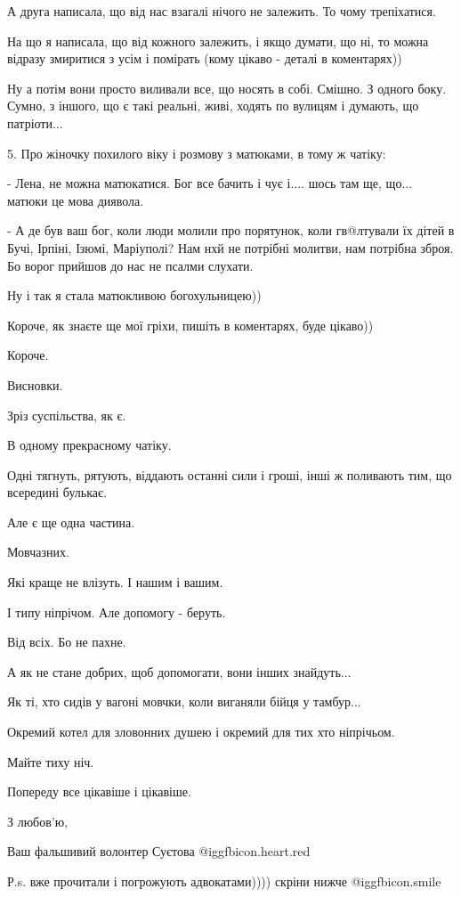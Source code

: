 А друга написала, що від нас взагалі нічого не залежить. То чому трепіхатися.

На що я написала, що від кожного залежить, і якщо думати, що ні, то можна
відразу змиритися з усім і помірать
 (кому цікаво  - деталі в коментарях))

Ну а потім вони просто виливали все, що носять в собі. 
Смішно. З одного боку.
Сумно, з іншого, що є такі реальні, живі, ходять по вулицям і думають, що патріоти...

5. Про жіночку похилого віку і розмову з матюками, в тому ж чатіку:

- Лена, не можна матюкатися. Бог все бачить і чує і.... шось там ще, що...
матюки це мова диявола.

- А де був ваш бог, коли люди молили про порятунок, коли гв@лтували їх дітей в
Бучі, Ірпіні, Ізюмі, Маріуполі? Нам нхй не потрібні молитви, нам потрібна
зброя. Бо ворог прийшов до нас не псалми слухати.

Ну і так я стала матюкливою богохульницею))

Короче, як знаєте ще мої гріхи, пишіть в коментарях, буде цікаво))

Короче.

Висновки.

Зріз суспільства, як є. 

В одному прекрасному чатіку.

Одні тягнуть, рятують, віддають останні сили і гроші, інші ж поливають тим, що
всередині булькає.

Але є ще одна частина.

Мовчазних. 

Які краще не влізуть. І нашим і вашим.

І типу ніпрічом. Але допомогу - беруть. 

Від всіх. Бо не пахне.

А як не стане добрих, щоб допомогати, вони інших знайдуть...

Як ті, хто сидів у вагоні мовчки, коли виганяли бійця у тамбур... 

Окремий котел для зловонних душею і окремий для тих хто ніпрічьом.

Майте тиху ніч. 

Попереду все цікавіше і цікавіше.

З любов'ю,  

Ваш фальшивий волонтер Суєтова @igg{fbicon.heart.red}

Р.s. вже прочитали і погрожують адвокатами)))) скріни нижче
@igg{fbicon.smile} 
